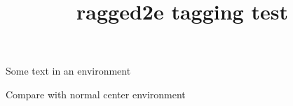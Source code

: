 \documentclass{article}
\title{ragged2e tagging test}
\begin{document}
\begin{Center}
Some text in an environment
\end{Center}

\begin{center}
Compare with normal center environment
\end{center}
\end{document}
